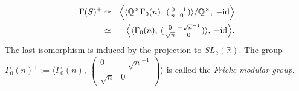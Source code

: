 \documentclass{article}
\theoremstyle{plain}
\theoremstyle{definition}
\theoremstyle{remark}
\newcommand{\Q}{{\mathbb Q}}
\newcommand{\R}{{\mathbb R}}
\begin{document}
\begin{eqnarray}\label{final description}
                     \Gamma (S)^{+} 
& \simeq  & 
                     \Bigl\langle 
                                    \langle 
                                           {\Q}^{\times}\Gamma _{0}(n),  \: 
                                                (\begin{smallmatrix}
                                                              0 & -1 \\
                                                               n &  0 
                                                   \end{smallmatrix})
                                     \rangle  / {\Q}^{\times},  \: 
                                    -{\rm id\/}
                      \Bigr\rangle    \nonumber\\
& \simeq  &  
                      \Bigl\langle 
                                      \langle 
                                             \Gamma _{0}(n),  \: 
                                               (\begin{smallmatrix}
                                                               0                  & -\sqrt{n}^{-1} \\
                                                                \sqrt{n}    &  0 
                                                 \end{smallmatrix})
                                      \rangle  ,  \: 
                                 -{\rm id\/} 
                       \Bigr\rangle  .
\end{eqnarray} 
The last isomorphism is induced  by the projection to $SL_{2}({\R})$.  
The group 
$
\Gamma _{0}(n)^{+} := 
\langle  \Gamma _{0}(n),  \:  (\begin{smallmatrix}
                                                               0                  & -\sqrt{n}^{-1} \\
                                                                \sqrt{n}    &  0 
                                                 \end{smallmatrix}) 
\rangle $ 
is called 
the {\it Fricke modular group\/}. 
\end{document}
